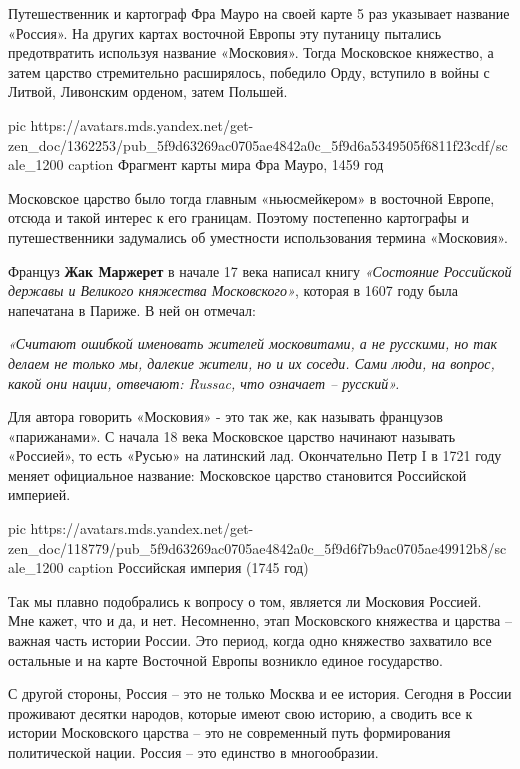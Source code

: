 Путешественник и картограф Фра Мауро на своей карте 5 раз указывает название
«Россия». На других картах восточной Европы эту путаницу пытались предотвратить
используя название «Московия». Тогда Московское княжество, а затем царство
стремительно расширялось, победило Орду, вступило в войны с Литвой, Ливонским
орденом, затем Польшей. 

\ifcmt
  pic https://avatars.mds.yandex.net/get-zen_doc/1362253/pub_5f9d63269ac0705ae4842a0c_5f9d6a5349505f6811f23cdf/scale_1200
  caption Фрагмент карты мира Фра Мауро, 1459 год
\fi


Московское царство было тогда главным «ньюсмейкером» в восточной Европе,
отсюда и такой интерес к его границам. Поэтому постепенно картографы и
путешественники задумались об уместности использования термина
«Московия».

Француз \textbf{Жак Маржерет} в начале 17 века написал книгу \emph{«Состояние Российской
державы и Великого княжества Московского»}, которая в 1607 году была
напечатана в Париже. В ней он отмечал:

\begin{leftbar}
	\begingroup
		\em
«Считают ошибкой именовать жителей московитами, а не русскими, но так делаем не только мы, далекие жители, но и их соседи. Сами люди, на вопрос, какой они нации, отвечают: Russac, что означает – русский». 
 
	\endgroup
\end{leftbar}

Для автора говорить «Московия» - это так же, как называть французов
«парижанами». С начала 18 века Московское царство начинают называть «Россией»,
то есть «Русью» на латинский лад. Окончательно Петр I в 1721 году меняет
официальное название: Московское царство становится Российской империей.


\ifcmt
  pic https://avatars.mds.yandex.net/get-zen_doc/118779/pub_5f9d63269ac0705ae4842a0c_5f9d6f7b9ac0705ae49912b8/scale_1200
  caption Российская империя (1745 год)
\fi

Так мы плавно подобрались к вопросу о том, является ли Московия Россией. Мне
кажет, что и да, и нет. Несомненно, этап Московского княжества и царства –
важная часть истории России. Это период, когда одно княжество захватило все
остальные и на карте Восточной Европы возникло единое государство.

С другой стороны, Россия – это не только Москва и ее история. Сегодня в России
проживают десятки народов, которые имеют свою историю, а сводить все к истории
Московского царства – это не современный путь формирования политической нации.
Россия – это единство в многообразии.

